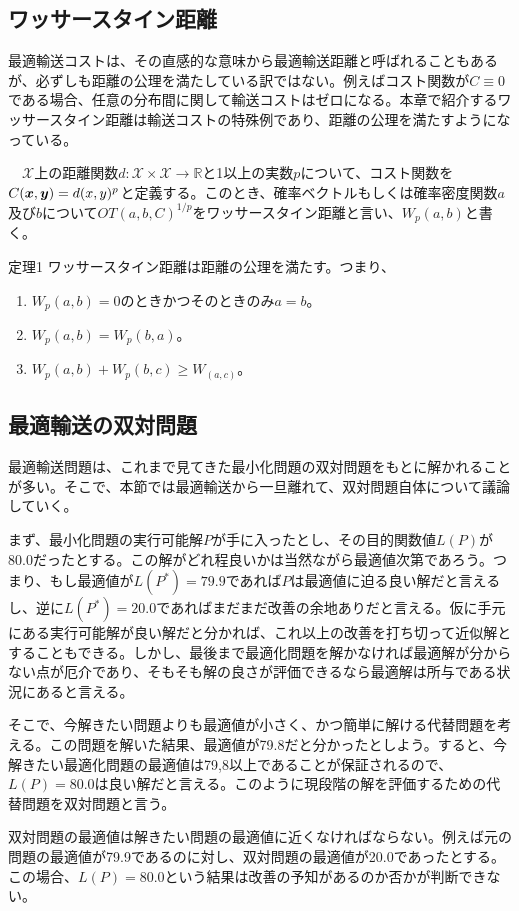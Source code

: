 \documentclass[dvipdfmx, 9pt, a4paper]{jsarticle}
\newcommand{\bm}[1]{{\mbox{\boldmath $#1$}}}
\begin{document}
\subsection{ワッサースタイン距離}
最適輸送コストは、その直感的な意味から最適輸送距離と呼ばれることもあるが、必ずしも距離の公理を満たしている訳ではない。例えばコスト関数が$C \equiv 0$である場合、任意の分布間に関して輸送コストはゼロになる。本章で紹介するワッサースタイン距離は輸送コストの特殊例であり、距離の公理を満たすようになっている。

\begin{tcolorbox}[title=ワッサースタイン距離]
　$\mathcal{X}$上の距離関数$d:\mathcal{X}\times \mathcal{X} \to \mathbb{R}$と1以上の実数$p$について、コスト関数を$C(\bm x, \bm y)=d(x, y)^p$と定義する。このとき、確率ベクトルもしくは確率密度関数$a$及び$b$について$OT(a, b, C)^{1/p}$をワッサースタイン距離と言い、$W_p(a, b)$と書く。
\end{tcolorbox}
\begin{itembox}[l]{定理1}
ワッサースタイン距離は距離の公理を満たす。つまり、
\begin{enumerate}
\item $W_p(a, b)=0$のときかつそのときのみ$a=b$。
\item $W_p(a, b) =W_p(b, a)$。
\item $W_p(a, b)+W_p(b, c) \geq W_(a, c)$。
\end{enumerate}
\end{itembox}

\subsection{最適輸送の双対問題}
最適輸送問題は、これまで見てきた最小化問題の双対問題をもとに解かれることが多い。そこで、本節では最適輸送から一旦離れて、双対問題自体について議論していく。\par
まず、最小化問題の実行可能解$P$が手に入ったとし、その目的関数値$L(P)$が80.0だったとする。この解がどれ程良いかは当然ながら最適値次第であろう。つまり、もし最適値が$L(P^*)=79.9$であれば$P$は最適値に迫る良い解だと言えるし、逆に$L(P^*)=20.0$であればまだまだ改善の余地ありだと言える。仮に手元にある実行可能解が良い解だと分かれば、これ以上の改善を打ち切って近似解とすることもできる。しかし、最後まで最適化問題を解かなければ最適解が分からない点が厄介であり、そもそも解の良さが評価できるなら最適解は所与である状況にあると言える。\par
そこで、今解きたい問題よりも最適値が小さく、かつ簡単に解ける代替問題を考える。この問題を解いた結果、最適値が79.8だと分かったとしよう。すると、今解きたい最適化問題の最適値は79,8以上であることが保証されるので、$L(P)=80.0$は良い解だと言える。このように現段階の解を評価するための代替問題を双対問題と言う。\par
双対問題の最適値は解きたい問題の最適値に近くなければならない。例えば元の問題の最適値が79.9であるのに対し、双対問題の最適値が20.0であったとする。この場合、$L(P)=80.0$という結果は改善の予知があるのか否かが判断できない。
\end{document}
